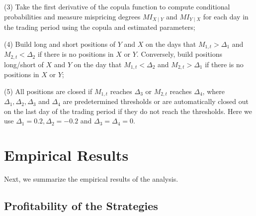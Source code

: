 \documentclass[a4paper,12pt]{report}
\begin{document}
	\vspace{0.3cm}
	\vspace{0.3cm}
	
	(3) Take the first derivative of the copula function to compute conditional
	probabilities and measure mispricing degrees $MI_{X\mid Y}$ and $MI_{Y\mid X}$ for each day in the trading period using the copula and estimated parameters;
	
	\vspace{0.3cm}
	\vspace{0.3cm}
	
	(4) Build long and short positions of $Y$ and $X$ on the days that $M_{1,t}>\Delta_{1}$ and $M_{2,t}<\Delta_{2}$ if there is no positions in $X$ or $Y$. Conversely, build positions long/short of $X$ and $Y$ on the day that $M_{1,t}<\Delta_{2}$ and $M_{2,t}>\Delta_{1}$ if there is no positions in $X$ or $Y$;
	
	\vspace{0.3cm}
	\vspace{0.3cm}
	
	(5) All positions are closed if $M_{1,t}$ reaches $\Delta_{3}$ or $M_{2,t}$ reaches $\Delta_{4}$, where $\Delta_{1},\Delta_{2},\Delta_{3}$ and $\Delta_{4}$ are predetermined thresholds or are automatically closed out on the last day of the trading period if they do not reach the thresholds. Here we use $\Delta_{1}=0.2, \Delta_{2}=-0.2$ and $\Delta_{3}=\Delta_{4}=0$.
	
	\vspace{0.6cm}
	
	\section{Empirical Results}
	
	Next, we summarize the empirical results of the analysis.
	
	\vspace{0.3cm}
	
	\subsection{Profitability of the Strategies}
	
\end{document}
